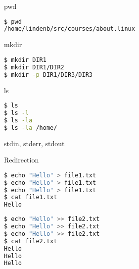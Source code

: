 \documentclass{beamer}
\begin{document}
\begin{frame}[fragile]
 \begin{center}
    \huge{pwd}\\
    \end{center}
\begin{lstlisting}[language=bash]
$ pwd
/home/lindenb/src/courses/about.linux
\end{lstlisting}
\end{frame}

\begin{frame}[fragile]
 \begin{center}
    \huge{mkdir}\\
    \end{center}
\begin{lstlisting}[language=bash]
$ mkdir DIR1
$ mkdir DIR1/DIR2
$ mkdir -p DIR1/DIR3/DIR3
\end{lstlisting}
\end{frame}

\begin{frame}[fragile]
 \begin{center}
    \huge{ls}\\
    \end{center}
\begin{lstlisting}[language=bash]
$ ls
$ ls -l
$ ls -la
$ ls -la /home/
\end{lstlisting}
\end{frame}

\begin{frame}[fragile]
 \begin{center}
    \huge{stdin, stderr, stdout}\\
  \end{center}
\end{frame}


\begin{frame}[fragile]
 \begin{center}
    \huge{Redirection}\\
  \end{center}
\begin{lstlisting}[language=bash]
$ echo "Hello" > file1.txt
$ echo "Hello" > file1.txt
$ echo "Hello" > file1.txt
$ cat file1.txt 
Hello
\end{lstlisting}

\begin{lstlisting}[language=bash]
$ echo "Hello" >> file2.txt
$ echo "Hello" >> file2.txt
$ echo "Hello" >> file2.txt
$ cat file2.txt 
Hello
Hello
Hello
\end{lstlisting}
\end{frame}
\end{document}
